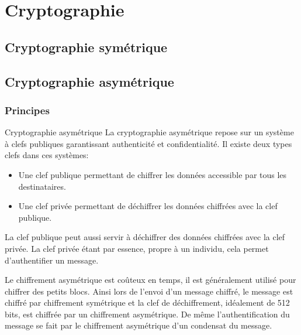 \documentclass[twoside,a4paper,12pt,titlepage]{book}
\begin{document}
\appendix
\chapter{Cryptographie}
\section{Cryptographie symétrique}
\section{Cryptographie asymétrique}
\subsection{Principes}
\begin{Define}{Cryptographie asymétrique}
La cryptographie asymétrique repose sur un système à clefs publiques garantissant authenticité et confidentialité. Il existe deux types clefs dans ces systèmes:\begin{itemize}
\item Une clef publique permettant de chiffrer les données accessible par tous les destinataires.
\item Une clef privée permettant de déchiffrer les données chiffrées avec la clef publique.
\end{itemize}
La clef publique peut aussi servir à déchiffrer des données chiffrées avec la clef privée. La clef privée étant par essence, propre à un individu, cela permet d'authentifier un message.
\end{Define}
\begin{Warning}
Le chiffrement asymétrique est coûteux en temps, il est généralement utilisé pour chiffrer des petits blocs. Ainsi lors de l'envoi d'un message chiffré, le message est chiffré par chiffrement symétrique et la clef de déchiffrement, idéalement de 512 bits, est chiffrée par un chiffrement asymétrique. De même l'authentification du message se fait par le chiffrement asymétrique d'un condensat du message.
\end{Warning}
\end{document}
